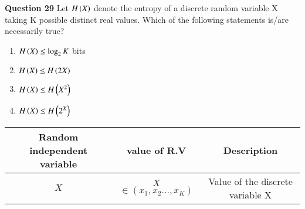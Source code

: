 \documentclass[journal,12pt,onecolumn]{IEEEtran}
\theoremstyle{remark}
\begin{document}
%
\textbf{Question 29}
Let $H\left(X\right)$ denote the entropy of a discrete
random variable X taking K possible distinct
real values. Which of the following statements
is/are necessarily true?
\begin{enumerate}[label=(\Alph*)]
\item 
$H\left(X\right)\leq \log _{2} K$ bits\\
\item 
$H\left(X\right) \leq H\left(2X\right)$\\
\item
$H\left(X\right)\leq H\left(X^2\right)$\\
\item
$H\left(X\right) \leq H\left(2^X\right)$\\
\end{enumerate}
\fi
\solution
\begin{table}[htpb]
\centering 
\begin{tabular}{|c|c|c|}
\hline
Random independent variable	&	value	of R.V		   &Description\\
\hline
$X$                         & $X$ $\in(x_1,x_2 ... ,x_K)$                                & Value of the discrete variable X\\
\hline
\end{tabular}
\end{table}
\end{document}
